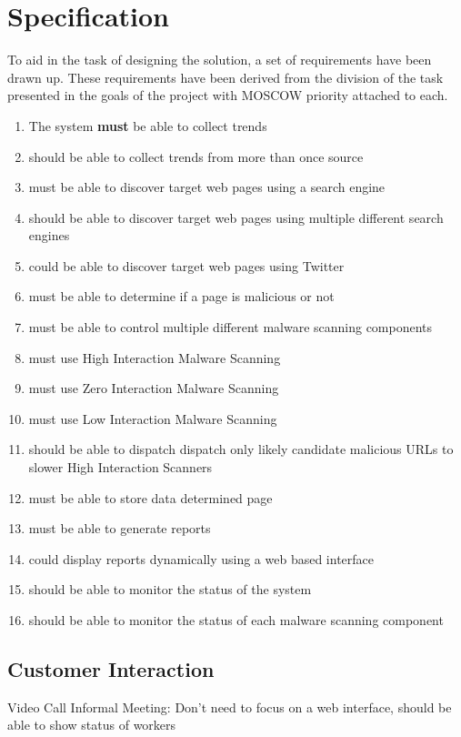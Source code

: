 \clearpage
\section{Specification}

To aid in the task of designing the solution, a set of requirements have been drawn up. These requirements have been derived from the division of the task presented in the goals of the project with MOSCOW priority attached to each.

\begin{enumerate}
    \item The system \textbf{must} be able to collect trends
    \item should be able to collect trends from more than once source
    
    \item must be able to discover target web pages using a search engine
    \item should be able to discover target web pages using multiple different search engines
    \item could be able to discover target web pages using Twitter
    
    \item must be able to determine if a page is malicious or not
    \item must be able to control multiple different malware scanning components
    \item must use High Interaction Malware Scanning
    \item must use Zero Interaction Malware Scanning
    \item must use Low Interaction Malware Scanning
    \item should be able to dispatch dispatch only likely candidate malicious URLs to slower High Interaction Scanners
    \item must be able to store data determined page
    \item must be able to generate reports
    \item could display reports dynamically using a web based interface
    \item should be able to monitor the status of the system
    \item should be able to monitor the status of each malware scanning component
\end{enumerate}

\subsection{Customer Interaction}
Video Call
Informal Meeting: Don't need to focus on a web interface, should be able to show status of workers

